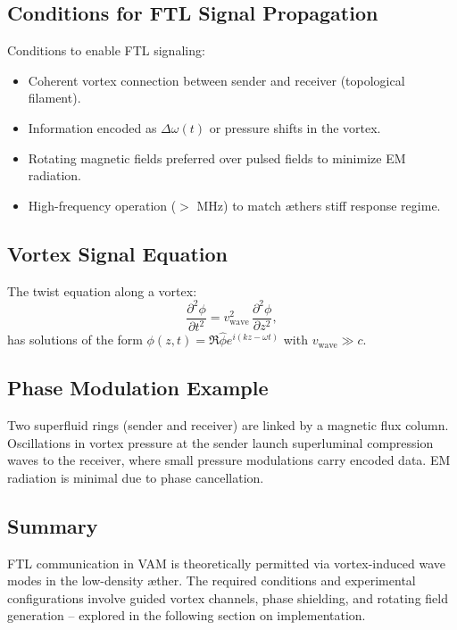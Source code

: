 \subsection{Conditions for FTL Signal Propagation}
Conditions to enable FTL signaling:
\begin{itemize}
    \item Coherent vortex connection between sender and receiver (topological filament).
    \item Information encoded as $\Delta \omega(t)$ or pressure shifts in the vortex.
    \item Rotating magnetic fields preferred over pulsed fields to minimize EM radiation.
    \item High-frequency operation ($>$ MHz) to match æther\rqs s stiff response regime.
\end{itemize}

\subsection{Vortex Signal Equation}
The twist equation along a vortex:
\begin{equation}
    \frac{\partial^2 \phi}{\partial t^2} = v_\text{wave}^2 \, \frac{\partial^2 \phi}{\partial z^2},
    \label{eq:vortexwave}
\end{equation}
has solutions of the form $\phi(z,t) = \Re{\hat{\phi} e^{i(kz - \omega t)}}$ with $v_\text{wave} \gg c$.

\subsection{Phase Modulation Example}
Two superfluid rings (sender and receiver) are linked by a magnetic flux column. Oscillations in vortex pressure at the sender launch superluminal compression waves to the receiver, where small pressure modulations carry encoded data. EM radiation is minimal due to phase cancellation.

\subsection{Summary}
FTL communication in VAM is theoretically permitted via vortex-induced wave modes in the low-density æther. The required conditions and experimental configurations involve guided vortex channels, phase shielding, and rotating field generation – explored in the following section on implementation.
